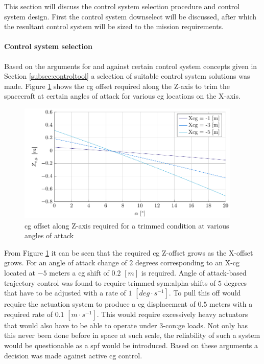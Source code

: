 This section will discuss the control system selection procedure and control system design. First the control system downselect will be discussed, after which the resultant control system will be sized to the mission requirements.
\paragraph{Control system selection}
Based on the arguments for and against certain control system concepts given in Section \ref{subsec:controltool} a selection of suitable control system solutions was made. Figure \ref{fig:cgoffset} shows the \gls{cg} offset required along the Z-axis to trim the spacecraft at certain angles of attack for various \gls{cg} locations on the X-axis. 
\begin{figure}[h]
	\centering
	\includegraphics[width=0.95\textwidth]{./Figure/control/moment}
	\caption[\acrlong{cg} offset along Z-axis required for a trimmed condition at various angles of attack]{\gls{cg} offset along Z-axis required for a trimmed condition at various angles of attack}
	\label{fig:cgoffset}
\end{figure}
From Figure \ref{fig:cgoffset} it can be seen that the required \gls{cg} Z-offset grows as the X-offset grows. For an angle of attack change of $2$ degrees corresponding to an X-\gls{cg} located at $-5$ meters a \gls{cg} shift of $0.2$ $[m]$ is required. Angle of attack-based trajectory control was found to require trimmed \gls{sym:alpha}-shifts of $5$ degrees that have to be adjusted with a rate of $1$ $[deg \cdot s^{-1}]$. To pull this off would require the actuation system to produce a \gls{cg} displacement of $0.5$ meters with a required rate of $0.1$ $[m \cdot s^{-1}]$. This would require excessively heavy actuators that would also have to be able to operate under 3-\gls{con:ge} loads. Not only has this never been done before in space at such scale, the reliability of such a system would be questionable as a \gls{spf} would be introduced. Based on these arguments a decision was made against active \gls{cg} control.

